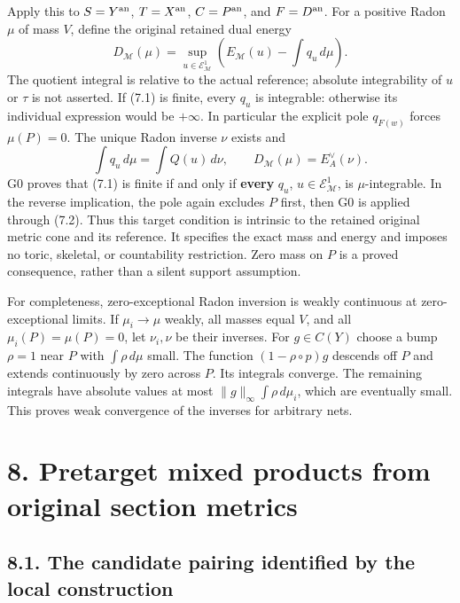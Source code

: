 \documentclass[
  10pt,
]{article}
\begin{document}
Apply this to \(S=Y^{\rm an}\), \(T=X^{\rm an}\), \(C=P^{\rm an}\), and
\(F=D^{\rm an}\). For a positive Radon \(\mu\) of mass \(V\), define the
original retained dual energy
\[D_{\mathcal M}(\mu)=\sup_{u\in\mathcal E^1_{\mathcal M}}
\left(E_{\mathcal M}(u)-\int q_u\,d\mu\right).             \tag{7.1}\]
The quotient integral is relative to the actual reference; absolute
integrability of \(u\) or \(\tau\) is not asserted. If (7.1) is finite,
every \(q_u\) is integrable: otherwise its individual expression would
be \(+\infty\). In particular the explicit pole \(q_{F(w)}\) forces
\(\mu(P)=0\). The unique Radon inverse \(\nu\) exists and
\[\int q_u\,d\mu=\int Q(u)\,d\nu,\qquad
D_{\mathcal M}(\mu)=E_A^\vee(\nu).                       \tag{7.2}\] G0
proves that (7.1) is finite if and only if \textbf{every} \(q_u\),
\(u\in\mathcal E^1_{\mathcal M}\), is \(\mu\)-integrable. In the reverse
implication, the pole again excludes \(P\) first, then G0 is applied
through (7.2). Thus this target condition is intrinsic to the retained
original metric cone and its reference. It specifies the exact mass and
energy and imposes no toric, skeletal, or countability restriction. Zero
mass on \(P\) is a proved consequence, rather than a silent support
assumption.

For completeness, zero-exceptional Radon inversion is weakly continuous
at zero-exceptional limits. If \(\mu_i\to\mu\) weakly, all masses equal
\(V\), and all \(\mu_i(P)=\mu(P)=0\), let \(\nu_i,\nu\) be their
inverses. For \(g\in C(Y)\) choose a bump \(\rho=1\) near \(P\) with
\(\int\rho\,d\mu\) small. The function \((1-\rho\circ p)g\) descends off
\(P\) and extends continuously by zero across \(P\). Its integrals
converge. The remaining integrals have absolute values at most
\(\|g\|_\infty\int\rho\,d\mu_i\), which are eventually small. This
proves weak convergence of the inverses for arbitrary nets.

\section{8. Pretarget mixed products from original section
metrics}\label{pretarget-mixed-products-from-original-section-metrics}

\subsection{8.1. The candidate pairing identified by the local
construction}\label{the-candidate-pairing-identified-by-the-local-construction}
\end{document}
